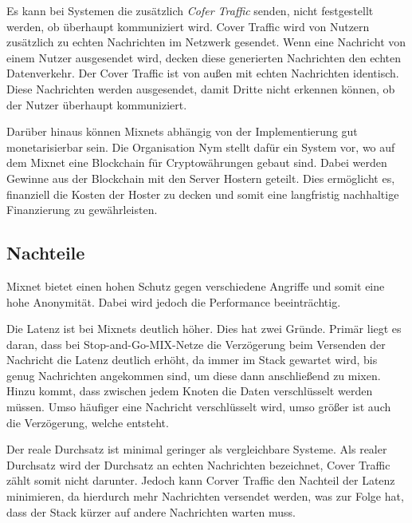 Es kann bei Systemen die zusätzlich \textit{Cofer Traffic} senden, nicht festgestellt werden, ob überhaupt kommuniziert wird. Cover Traffic wird von Nutzern zusätzlich zu echten Nachrichten im Netzwerk gesendet. Wenn eine Nachricht von einem Nutzer ausgesendet wird, decken diese generierten Nachrichten den echten Datenverkehr. Der Cover Traffic ist von außen mit echten Nachrichten identisch. Diese Nachrichten werden ausgesendet, damit Dritte nicht erkennen können, ob der Nutzer überhaupt kommuniziert\cite{LoopixAnonymitySystem}.

Darüber hinaus können Mixnets abhängig von der Implementierung gut monetarisierbar sein. Die Organisation Nym stellt dafür ein System vor, wo auf dem Mixnet eine Blockchain für Cryptowährungen gebaut sind. Dabei werden Gewinne aus der Blockchain mit den Server Hostern geteilt. Dies ermöglicht es, finanziell die Kosten der Hoster zu decken und somit eine langfristig nachhaltige Finanzierung zu gewährleisten\cite{RewardSharingForMixnets}.

\subsection{Nachteile}
\label{chap:mixnet_disadvantages}

Mixnet bietet einen hohen Schutz gegen verschiedene Angriffe und somit eine hohe Anonymität. Dabei wird jedoch die Performance beeinträchtig.

Die Latenz ist bei Mixnets deutlich höher. Dies hat zwei Gründe. Primär liegt es daran, dass bei Stop-and-Go-MIX-Netze die Verzögerung beim Versenden der Nachricht die Latenz deutlich erhöht, da immer im Stack gewartet wird, bis genug Nachrichten angekommen sind, um diese dann anschließend zu mixen. Hinzu kommt, dass zwischen jedem Knoten die Daten verschlüsselt werden müssen. Umso häufiger eine Nachricht verschlüsselt wird, umso größer ist auch die Verzögerung, welche entsteht\cite{EffectivenessOfMixnets}.

Der reale Durchsatz ist minimal geringer als vergleichbare Systeme. Als realer Durchsatz wird der Durchsatz an echten Nachrichten bezeichnet, Cover Traffic zählt somit nicht darunter. Jedoch kann Corver Traffic den Nachteil der Latenz minimieren, da hierdurch mehr Nachrichten versendet werden, was zur Folge hat, dass der Stack kürzer auf andere Nachrichten warten muss.
